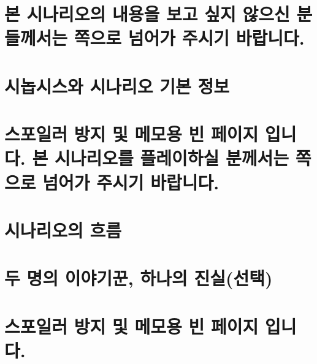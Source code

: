 \documentclass{report}
\begin{document}
	\chapter*{본 시나리오의 내용을 보고 싶지 않으신 분들께서는 \pageref{endof_Dream}쪽으로 넘어가 주시기 바랍니다.}
	
	\chapter{시놉시스와 시나리오 기본 정보}
	
	
	\chapter*{스포일러 방지 및 메모용 빈 페이지 입니다. 본 시나리오를 플레이하실 분께서는 \pageref{endof_Dream}쪽으로 넘어가 주시기 바랍니다.}
	
	\parttoc
	
	\chapter{시나리오의 흐름}
	
	
	\chapter{두 명의 이야기꾼, 하나의 진실(선택)}
	
	
	\chapter*{스포일러 방지 및 메모용 빈 페이지 입니다.}
\end{document}
